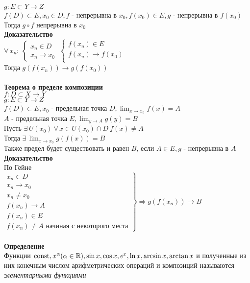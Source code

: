 \documentclass[12pt]{article}
\begin{document}
$g:E\subset Y \rightarrow Z$\\
$f(D) \subset E, x_0 \in D, f$ - непрерывна в $x_0, f(x_0) \in E, g$ - непрерывна в $f(x_0)$\\
Тогда $g\circ f$ непрерывна в $x_0$\\
\textbf{Доказательство}\\
$\forall\,x_n:\ \left\{\begin{array}{l}
     x_n \in D\\
     x_n \rightarrow x_0
\end{array}\right.\ \left\{\begin{array}{l}
     f(x_n) \in E\\
     f(x_n) \rightarrow f(x_0)\\
\end{array}\right.$\\
Тогда $g(f(x_n)) \rightarrow g(f(x_0))$\\\\
\textbf{Теорема о пределе композиции}\\
$f: D \subset X \rightarrow Y$\\
$g: E\subset Y \rightarrow Z$\\
$f(D) \subset E, x_0$ - предельная точка $D, \lim_{x\rightarrow x_0} f(x) = A$\\
$A$ - предельная точка $E, \lim_{y\rightarrow A} g(y) = B$\\
Пусть $\exists\,U(x_0)\ \forall\, x\in U(x_0) \cap D\ f(x) \neq A$\\
Тогда $\exists\,\lim_{x\rightarrow x_0} g(f(x)) = B$\\
Также предел будет существовать и равен $B$, если $A\in E, g$ - непрерывна в $A$\\
\textbf{Доказательство}\\
По Гейне\\
$\left.\begin{array}{l}
     x_n \in D\\
     x_n \rightarrow x_0\\
     x_n \neq x_0\\
     f(x_n) \rightarrow A\\
     f(x_n) \in E\\
     f(x_n) \neq A \text{ начиная с некоторого места}
\end{array}\right\} \Rightarrow g(f(x_n)) \rightarrow B$\\\\
\textbf{Определение}\\
Функции $\operatorname{const}, x^\alpha (\alpha \in \mathbb{R}), \sin x, \cos x, e^x, \ln x, \arcsin x, \arctan x$ и полученные из них конечным числом арифметрических операций и композиций называются \textit{элементарными функциями}\\
\end{document}
